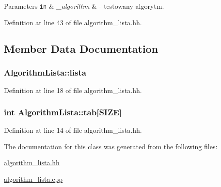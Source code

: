 \begin{DoxyParams}[1]{Parameters}
\mbox{\tt in}  & {\em \+\_\+algorithm} & -\/ testowany algorytm. \\
\hline
\end{DoxyParams}


Definition at line 43 of file algorithm\+\_\+lista.\+hh.



\subsection{Member Data Documentation}
\hypertarget{class_algorithm_lista_a5c4c8b55e6d71eae06c98cd39f38bb30}{}
\subsubsection[{lista}]{ Algorithm\+Lista\+::lista\hspace{0.3cm}{\ttfamily [private]}}\label{class_algorithm_lista_a5c4c8b55e6d71eae06c98cd39f38bb30}


Definition at line 18 of file algorithm\+\_\+lista.\+hh.

\hypertarget{class_algorithm_lista_ad04d74953d75c8886b0c5cfda71773f7}{}
\subsubsection[{tab}]{\setlength{\rightskip}{0pt plus 5cm}int Algorithm\+Lista\+::tab\mbox{[}{\bf S\+I\+Z\+E}\mbox{]}\hspace{0.3cm}{\ttfamily [private]}}\label{class_algorithm_lista_ad04d74953d75c8886b0c5cfda71773f7}


Definition at line 14 of file algorithm\+\_\+lista.\+hh.



The documentation for this class was generated from the following files\+:\begin{DoxyCompactItemize}
\item 
\hyperlink{algorithm__lista_8hh}{algorithm\+\_\+lista.\+hh}\item 
\hyperlink{algorithm__lista_8cpp}{algorithm\+\_\+lista.\+cpp}\end{DoxyCompactItemize}
